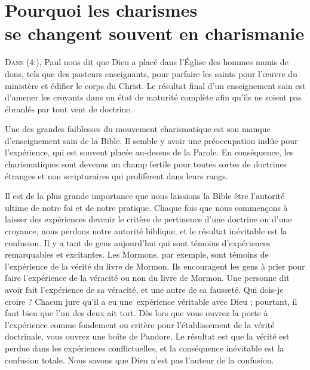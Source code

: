 \chapter[Pourquoi les charismes se changent souvent en charismanie]{Pourquoi les charismes\\ se changent souvent en charismanie}
\renewcommand{\chaphead}{\textls[0]{Pourquoi les charismes se changent souvent en charismanie}}

\lettrine{D}{ans (4:),}
 Paul nous dit que Dieu a placé dans l'Église
 des hommes munis de dons, tels que des pasteurs enseignants,
 pour parfaire les saints pour l'œuvre du ministère et édifier le corps
 du Christ. Le résultat final d'un enseignement sain est d'amener
 les croyants dans un état de maturité complète afin qu'ils ne soient
 pas ébranlés par tout vent de doctrine.

Une des grandes faiblesses du mouvement charismatique est son manque
 d'enseignement sain de la Bible. Il semble y avoir une préoccupation
 indûe pour l'expérience, qui est souvent placée au-dessus de la Parole.
 En conséquence, les charismatiques sont devenus un champ fertile
 pour toutes sortes de doctrines étranges et non scripturaires qui prolifèrent
 dans leurs rangs.

Il est de la plus grande importance que nous laissions la Bible être
 l'autorité ultime de notre foi et de notre pratique.
 Chaque fois que nous commençons à laisser des expériences
 devenir le critère de pertinence d'une doctrine ou d'une croyance,
 nous perdons notre autorité biblique, et le résultat inévitable
 est la confusion. Il y a tant de gens aujourd'hui qui sont témoins
 d'expériences remarquables et excitantes. Les Mormons, par exemple,
 \Og sont témoins \Fg{} de l'expé\-rience de la vérité du livre de Mormon.
 Ils encouragent les gens à prier pour faire l'expérience de la véracité
 ou non du livre de Mormon. Une personne dit avoir fait l'expérience
 de sa véracité, et une autre de sa fausseté. Qui dois-je croire ?
 Chacun jure qu'il a eu une~expérience véritable avec Dieu ;
 pourtant, il faut bien que l'un des deux ait tort.
 Dès lors que vous ouvrez la porte à l'expérience comme fondement
 ou critère pour l'établissement de la vérité doctrinale, vous ouvrez une boîte de Pandore.
 Le résultat est que la vérité est perdue dans les expériences
 conflictuelles, et la conséquence inévitable est la confusion totale.
 Nous savons que Dieu n'est pas l'auteur de la confusion.


